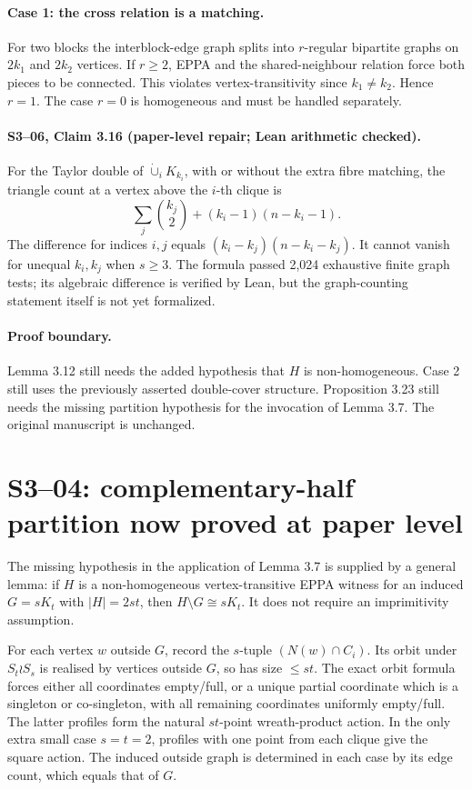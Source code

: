 \documentclass{article}
\begin{document}
\paragraph{Case 1: the cross relation is a matching.}
For two blocks the interblock-edge graph splits into
\(r\)-regular bipartite graphs on \(2k_1\) and \(2k_2\)
vertices. If \(r\ge2\), EPPA and the shared-neighbour
relation force both pieces to be connected. This violates
vertex-transitivity since \(k_1\ne k_2\).
Hence \(r=1\). The case \(r=0\) is homogeneous
and must be handled separately.

\paragraph{S3--06, Claim 3.16 (paper-level repair; Lean arithmetic checked).}
For the Taylor double of \(\dot\cup_iK_{k_i}\), with or
without the extra fibre matching, the triangle count
at a vertex above the \(i\)-th clique is
\[
 \sum_j\binom{k_j}{2}+(k_i-1)(n-k_i-1).
\]
The difference for indices \(i,j\) equals
\((k_i-k_j)(n-k_i-k_j)\). It cannot vanish
for unequal \(k_i,k_j\) when \(s\ge3\).
The formula passed 2,024 exhaustive finite graph tests;
its algebraic difference is verified by Lean, but the
graph-counting statement itself is not yet formalized.

\paragraph{Proof boundary.}
Lemma 3.12 still needs the added hypothesis
that \(H\) is non-homogeneous. Case 2 still uses the
previously asserted double-cover structure.
Proposition 3.23 still needs the missing partition
hypothesis for the invocation of Lemma 3.7.
The original manuscript is unchanged.

\section*{S3--04: complementary-half partition now proved at paper level}
The missing hypothesis in the application of Lemma 3.7
is supplied by a general lemma:
if \(H\) is a non-homogeneous vertex-transitive
EPPA witness for an induced \(G=sK_t\) with
\(|H|=2st\), then \(H\setminus G\cong sK_t\).
It does not require an imprimitivity assumption.

For each vertex \(w\) outside \(G\), record the
\(s\)-tuple \((N(w)\cap C_i)\).
Its orbit under \(S_t\wr S_s\) is realised
by vertices outside \(G\), so has size \(\le st\).
The exact orbit formula forces either all coordinates
empty/full, or a unique partial coordinate which is a
singleton or co-singleton, with all remaining coordinates
uniformly empty/full. The latter profiles form the
natural \(st\)-point wreath-product action.
In the only extra small case \(s=t=2\), profiles with
one point from each clique give the square action.
The induced outside graph is determined in each case
by its edge count, which equals that of \(G\).
\end{document}
